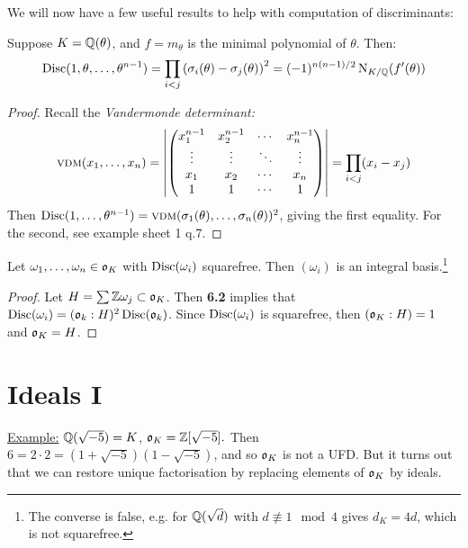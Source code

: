 \documentclass[10pt,a4paper]{article}
\begin{document}
We will now have a few useful results to help with computation of discriminants:
\begin{proposition}
Suppose $K = \mathbb{Q}(\theta)$, and $f = m_{\theta}$ is the minimal polynomial of $\theta$. Then:
\begin{align*}
\operatorname{Disc}(1, \theta, \ldots, \theta^{n-1}) = \prod_{i<j} \left(\sigma_i(\theta) - \sigma_j(\theta)\right)^2 = (-1)^{n(n-1)/2}\operatorname{N}_{K/\mathbb{Q}}(f'(\theta))
\end{align*}
\end{proposition}
\begin{proof}
Recall the \emph{Vandermonde determinant:}
\begin{align*}
\operatorname{\textsc{vdm}}(x_1, \ldots, x_n) = \left|\begin{pmatrix}
x_1^{n-1} & x_2^{n-1} & \cdots & x_n^{n-1} \\ \vdots & \vdots & \ddots & \vdots \\ x_1 & x_2 & \cdots & x_n \\ 1 & 1 & \cdots & 1 \end{pmatrix}\right| = \prod_{i<j} (x_i - x_j)
\end{align*}
Then $\operatorname{Disc}(1, \ldots, \theta^{n-1}) = \operatorname{\textsc{vdm}}(\sigma_1(\theta), \ldots, \sigma_n(\theta))^2$, giving the first equality. For the second, see example sheet 1 q.7.
\end{proof}

\begin{proposition}
Let $\omega_1, \ldots, \omega_n \in \mathfrak{o}_K$ with $\operatorname{Disc}(\omega_i)$ squarefree. Then $(\omega_i)$ is an integral basis.\footnote{The converse is false, e.g. for $\mathbb{Q}(\sqrt{d})$ with $d \nequiv 1 \mod 4$ gives $d_K = 4d$, which is not squarefree.}
\end{proposition}
\begin{proof}
Let $H = \sum \mathbb{Z} \omega_j \subset \mathfrak{o}_K$. Then \textbf{6.2} implies that $\operatorname{Disc}(\omega_i) = (\mathfrak{o}_k:H)^2 \operatorname{Disc}(\mathfrak{o}_k)$. Since $\operatorname{Disc}(\omega_i)$ is squarefree, then $(\mathfrak{o}_K:H) = 1$ and $\mathfrak{o}_K = H$.
\end{proof}

\section{Ideals I}
\underline{Example:} $\mathbb{Q}(\sqrt{-5}) = K$, $\mathfrak{o}_K = \mathbb{Z}[\sqrt{-5}].$ Then $6=2\cdot 2 = (1+\sqrt{-5})(1-\sqrt{-5})$, and so $\mathfrak{o}_K$ is not a UFD. But it turns out that we can restore unique factorisation by replacing elements of $\mathfrak{o}_K$ by ideals. 
\end{document}
